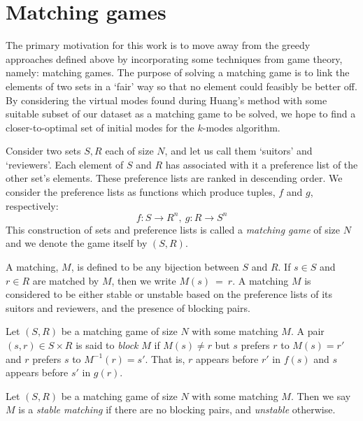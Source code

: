 \section{Matching games}\label{sec:matching}

The primary motivation for this work is to move away from the greedy approaches
defined above by incorporating some techniques from game theory, namely:
matching games. The purpose of solving a matching game is to link the elements
of two sets in a `fair' way so that no element could feasibly be better off. By
considering the virtual modes found during Huang's method with some suitable
subset of our dataset as a matching game to be solved, we hope to find a
closer-to-optimal set of initial modes for the \(k\)-modes algorithm.

\begin{definition}\label{def:matching_game}
    Consider two sets \(S, R\) each of size \(N\), and let us call them 
    `suitors' and `reviewers'. Each element of \(S\) and \(R\) has associated 
    with it a preference list of the other set's elements. These preference 
    lists are ranked in descending order. We consider the preference lists as 
    functions which produce tuples, \(f\) and \(g\), respectively:
	\[
	    f : S \to R^n, \ g : R \to S^n
	\]
	This construction of sets and preference lists is called a 
    \emph{matching game} of size \(N\) and we denote the game itself by 
    \((S,R)\).
	
    A matching, \(M\), is defined to be any bijection between \(S\) and \(R\). 
    If \(s \in S\) and \(r \in R\) are matched by \(M\), then we write
    \(M(s)~=~r\). A matching \(M\) is considered to be either stable or unstable
    based on the preference lists of its suitors and reviewers, and the presence
    of blocking pairs.
\end{definition}

\begin{definition}\label{def:blocking_pair}
    Let \((S, R)\) be a matching game of size \(N\) with some matching \(M\). A 
    pair \((s, r) \in S \times R\) is said to \emph{block} \(M\) if \(M(s) \neq
    r\) but \(s\) prefers \(r\) to \(M(s) = r'\) and \(r\) prefers \(s\) to
    \(M^{-1}(r) = s'\). That is, \(r\) appears before \(r'\) in \(f(s)\) and
    \(s\) appears before \(s'\) in \(g(r)\).
\end{definition}

\begin{definition}\label{def:stable_matching}
    Let \((S, R)\) be a matching game of size \(N\) with some matching \(M\). 
    Then we say \(M\) is a \emph{stable matching} if there are no blocking 
    pairs, and \emph{unstable} otherwise.
\end{definition}

